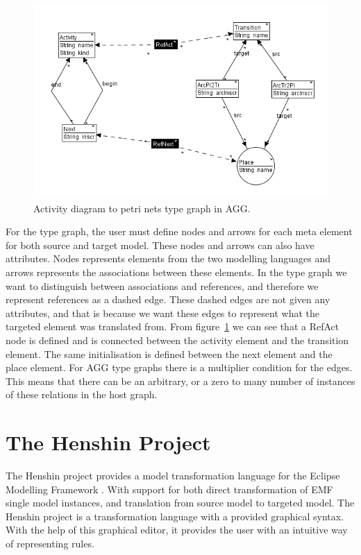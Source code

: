 \documentclass[pdftex,11pt,a4paper]{article}
\begin{document}
\begin{figure}[H]
	\centering
	\includegraphics[scale=0.7]{figures/AggTypeGraph.png}
	\caption{Activity diagram to petri nets type graph in AGG.}
	\label{fig:AggTypeGraph}
\end{figure}

\indent For the type graph, the user must define nodes and arrows for each meta
element for both source and target model. These nodes and arrows can also have
attributes. Nodes represents elements from the two modelling languages and
arrows represents the associations between these elements. In the type graph we
want to distinguish between associations and references, and therefore we
represent references as a dashed edge. These dashed edges are not given any
attributes, and that is because we want these edges to represent what the
targeted element was translated from. From figure~\ref{fig:AggTypeGraph} we can
see that a RefAct node is defined and is connected between the activity
element and the transition element. The same initialisation is defined between
the next element and the place element. For AGG type graphs there is a
multiplier condition for the edges. This means that there can be an arbitrary,
or a zero to many number of instances of these relations in the host graph.

\section{The Henshin Project}

\noindent The Henshin project\cite{Henshin} provides a model transformation
language for the Eclipse Modelling Framework \cite{Steinberg2009}. With support
for both direct transformation of EMF single model instances, and translation
from source model to targeted model. The Henshin project is a transformation
language with a provided graphical syntax. With the help of this graphical
editor, it provides the user with an intuitive way of representing rules. 
\end{document}
